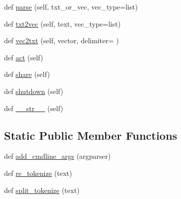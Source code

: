 \begin{DoxyCompactItemize}
\item 
def \hyperlink{classparlai_1_1agents_1_1legacy__agents_1_1seq2seq_1_1dict__v1_1_1DictionaryAgent_acae89a6d1049de6fd2cab06c7804dcdd}{parse} (self, txt\+\_\+or\+\_\+vec, vec\+\_\+type=list)
\item 
def \hyperlink{classparlai_1_1agents_1_1legacy__agents_1_1seq2seq_1_1dict__v1_1_1DictionaryAgent_a8419b546a12830d98e1eb14615744294}{txt2vec} (self, text, vec\+\_\+type=list)
\item 
def \hyperlink{classparlai_1_1agents_1_1legacy__agents_1_1seq2seq_1_1dict__v1_1_1DictionaryAgent_a8dd6e4af55a5f5d05d692198e044c5fe}{vec2txt} (self, vector, delimiter=\textquotesingle{} \textquotesingle{})
\item 
def \hyperlink{classparlai_1_1agents_1_1legacy__agents_1_1seq2seq_1_1dict__v1_1_1DictionaryAgent_a46c77fca1e6062b363ed8ee402d46986}{act} (self)
\item 
def \hyperlink{classparlai_1_1agents_1_1legacy__agents_1_1seq2seq_1_1dict__v1_1_1DictionaryAgent_a7322a3d5e19a0c52cd76d4682cccf46c}{share} (self)
\item 
def \hyperlink{classparlai_1_1agents_1_1legacy__agents_1_1seq2seq_1_1dict__v1_1_1DictionaryAgent_a7758fcd79e9a391b4f4bd45e030fc59b}{shutdown} (self)
\item 
def \hyperlink{classparlai_1_1agents_1_1legacy__agents_1_1seq2seq_1_1dict__v1_1_1DictionaryAgent_aaf643731fb8c436d729c5dc97c10c758}{\+\_\+\+\_\+str\+\_\+\+\_\+} (self)
\end{DoxyCompactItemize}
\subsection*{Static Public Member Functions}
\begin{DoxyCompactItemize}
\item 
def \hyperlink{classparlai_1_1agents_1_1legacy__agents_1_1seq2seq_1_1dict__v1_1_1DictionaryAgent_af61a97dffe00fd1289b0389a6916aa35}{add\+\_\+cmdline\+\_\+args} (argparser)
\item 
def \hyperlink{classparlai_1_1agents_1_1legacy__agents_1_1seq2seq_1_1dict__v1_1_1DictionaryAgent_abff9231bccd54f5222bef672dd978516}{re\+\_\+tokenize} (text)
\item 
def \hyperlink{classparlai_1_1agents_1_1legacy__agents_1_1seq2seq_1_1dict__v1_1_1DictionaryAgent_aed9556a06d40dbe376350c6c00694843}{split\+\_\+tokenize} (text)
\end{DoxyCompactItemize}
